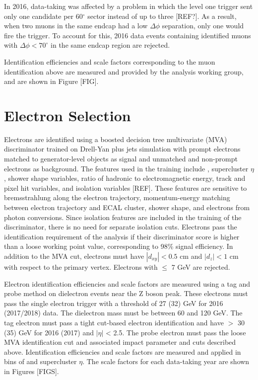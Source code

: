 In 2016, data-taking was affected by a problem in which the level one trigger sent only one candidate per 60$^{\circ}$ sector instead 
of up to three [REF?]. As a result, when two muons in the same endcap had a low $\Delta \phi$ separation, only one would fire the 
trigger. To account for this, 2016 data events containing identified muons with $\Delta \phi < 70^{\circ}$ in the same endcap region 
are rejected. 

Identification efficiencies and scale factors corresponding to the muon identification above are measured and provided by the 
\hzz analysis working group, and are shown in Figure [FIG].  

\section{Electron Selection}
Electrons are identified using a boosted decision tree multivariate (MVA) discriminator trained on Drell-Yan plus jets simulation 
with prompt electrons matched to generator-level objects as signal and unmatched and non-prompt electrons as background. The features 
used in the training include \pT, supercluster $\eta$, shower shape variables, ratio of hadronic to electromagnetic energy, track and 
pixel hit variables, and isolation variables [REF]. These features are sensitive to bremsstrahlung along the electron trajectory, 
momentum-energy matching between electron trajectory and ECAL cluster, shower shape, and electrons from photon conversions.
Since isolation features are included in the training of the discriminator, there is no need for separate isolation cuts. 
Electrons pass the identification requirement of the \hzg analysis if their discriminator score is higher than a loose working point 
value, corresponding to 98\% signal efficiency. In addition to the MVA cut, electrons must have $|d_{xy}| < 0.5$ cm and $|d_{z}| < 1$ cm
with respect to the primary vertex. Electrons with \pT $\leq$ 7 GeV are rejected. 

Electron identification efficiencies and scale factors are measured using a tag and probe method on dielectron events near the 
Z boson peak. These electrons must pass the single electron trigger with a \pT threshold of 27 (32) GeV for 2016 (2017/2018) data. 
The dielectron mass must be between 60 and 120 GeV. The tag electron must pass a tight cut-based electron identification and have 
\pT $>$ 30 (35) GeV for 2016 (2017) and $|\eta|$ < 2.5. The probe electron must pass the loose MVA identification cut and associated 
impact parameter and \pT cuts described above. Identification efficiencies and scale factors are measured and applied in bins of 
\pT and supercluster $\eta$. The scale factors for each data-taking year are shown in Figures [FIGS]. 

